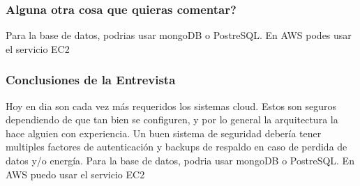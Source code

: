 \documentclass{article}
\begin{document}
\subsubsection{Alguna otra cosa que quieras comentar?}
Para la base de datos, podrias usar mongoDB o PostreSQL. En AWS podes usar el servicio EC2

\subsubsection{Conclusiones de la Entrevista}
Hoy en dia son cada vez más requeridos los sistemas cloud. Estos son seguros dependiendo de que tan bien se configuren, y por
lo general la arquitectura la hace alguien con experiencia. Un buen sistema de seguridad debería tener multiples factores de autenticación 
y backups de respaldo en caso de perdida de datos y/o energía. Para la base de datos, podria usar mongoDB o PostreSQL.
En AWS puedo usar el servicio EC2
\end{document}
